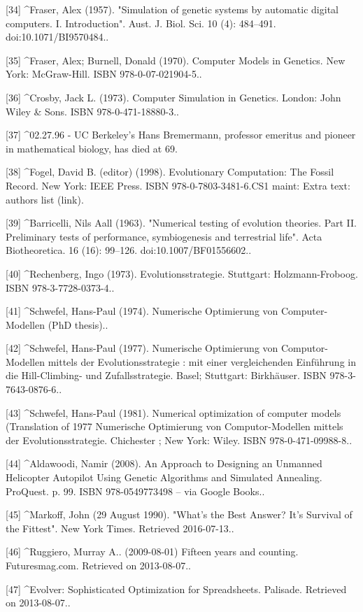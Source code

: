 [34]
^Fraser, Alex (1957). "Simulation of genetic systems by automatic digital computers. I. Introduction". Aust. J. Biol. Sci. 10 (4): 484–491. doi:10.1071/BI9570484..

[35]
^Fraser, Alex; Burnell, Donald (1970). Computer Models in Genetics. New York: McGraw-Hill. ISBN 978-0-07-021904-5..

[36]
^Crosby, Jack L. (1973). Computer Simulation in Genetics. London: John Wiley & Sons. ISBN 978-0-471-18880-3..

[37]
^02.27.96 - UC Berkeley's Hans Bremermann, professor emeritus and pioneer in mathematical biology, has died at 69.

[38]
^Fogel, David B. (editor) (1998). Evolutionary Computation: The Fossil Record. New York: IEEE Press. ISBN 978-0-7803-3481-6.CS1 maint: Extra text: authors list (link).

[39]
^Barricelli, Nils Aall (1963). "Numerical testing of evolution theories. Part II. Preliminary tests of performance, symbiogenesis and terrestrial life". Acta Biotheoretica. 16 (16): 99–126. doi:10.1007/BF01556602..

[40]
^Rechenberg, Ingo (1973). Evolutionsstrategie. Stuttgart: Holzmann-Froboog. ISBN 978-3-7728-0373-4..

[41]
^Schwefel, Hans-Paul (1974). Numerische Optimierung von Computer-Modellen (PhD thesis)..

[42]
^Schwefel, Hans-Paul (1977). Numerische Optimierung von Computor-Modellen mittels der Evolutionsstrategie : mit einer vergleichenden Einführung in die Hill-Climbing- und Zufallsstrategie. Basel; Stuttgart: Birkhäuser. ISBN 978-3-7643-0876-6..

[43]
^Schwefel, Hans-Paul (1981). Numerical optimization of computer models (Translation of 1977 Numerische Optimierung von Computor-Modellen mittels der Evolutionsstrategie. Chichester ; New York: Wiley. ISBN 978-0-471-09988-8..

[44]
^Aldawoodi, Namir (2008). An Approach to Designing an Unmanned Helicopter Autopilot Using Genetic Algorithms and Simulated Annealing. ProQuest. p. 99. ISBN 978-0549773498 – via Google Books..

[45]
^Markoff, John (29 August 1990). "What's the Best Answer? It's Survival of the Fittest". New York Times. Retrieved 2016-07-13..

[46]
^Ruggiero, Murray A.. (2009-08-01) Fifteen years and counting. Futuresmag.com. Retrieved on 2013-08-07..

[47]
^Evolver: Sophisticated Optimization for Spreadsheets. Palisade. Retrieved on 2013-08-07..


